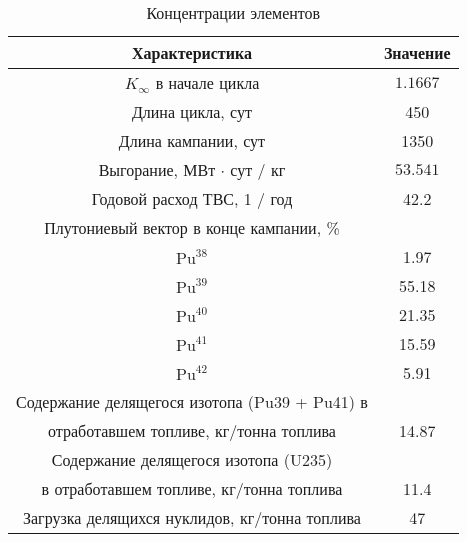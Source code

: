 \begin{table}[H]
	\caption{Концентрации элементов}
	\begin{center}
        \begin{tabular}{|c|c|}
        \toprule
         Характеристика & Значение\\ 
         \midrule
         \hline
          $K_\infty$ в начале цикла & $1.1667$\\
         \hline
          Длина цикла, сут & 450 \\
         \hline
          Длина кампании, сут & 1350\\
         \hline
          Выгорание, МВт $\cdot$ сут / кг & $53.541$\\
         \hline
          Годовой расход ТВС, 1 / год & 42.2\\
         \hline
          Плутониевый вектор в конце кампании, \% & \\
         \hline
          $\text{Pu}^{38}$ & 1.97 \\
         \hline
          $\text{Pu}^{39}$ & 55.18 \\
         \hline
          $\text{Pu}^{40}$ & 21.35\\
         \hline
          $\text{Pu}^{41}$ & 15.59 \\
         \hline
          $\text{Pu}^{42}$ & 5.91 \\
         \hline
         Содержание делящегося изотопа (Pu39 + Pu41) в \\ отработавшем топливе, кг/тонна топлива & 14.87\\
         \hline
         Содержание делящегося изотопа (U235)\\ в отработавшем топливе, кг/тонна топлива & 11.4 \\
         \hline
         Загрузка делящихся нуклидов, кг/тонна топлива & 47 \\
         \bottomrule
		\end{tabular}
		\label{tabular:burnup}
	\end{center}
\end{table}







